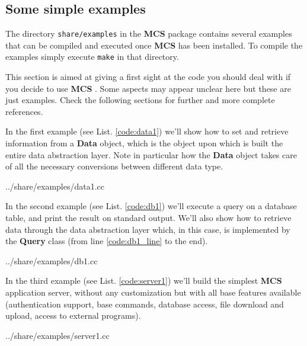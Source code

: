 \documentclass[12pt,titlepage]{article}
\newcommand{\mcs}{\textbf{MCS} }
\begin{document}
%
%
\subsection{Some simple examples}
\label{sec-somesimpleexamples}
The directory \verb|share/examples| in the \mcs package contains several
examples that can be compiled and executed once \mcs has been installed. To
compile the examples simply execute \verb|make| in that directory.

\bigskip
\noindent
This section is aimed at giving a first sight at the code you should
deal with if you decide to use \mcs. Some aspects may appear unclear
here but these are just examples. Check the following sections for
further and more complete references.

\medskip
\noindent
In the first example (see List. \ref{code:data1}) we'll show
how to set and retrieve information from a \textbf{Data} object, which
is the object upon which is built the entire data abstraction layer.
Note in particular how the \textbf{Data} object takes care of all
the necessary conversions between different data type.


{../share/examples/data1.cc}
\normalsize

\medskip
\noindent
In the second example (see List. \ref{code:db1}) we'll execute
a query on a database table, and print the result on standard output.
We'll also show how to retrieve data through the data abstraction
layer which, in this case, is implemented by the \textbf{Query} class
(from line \ref{code:db1_line} to the end).


{../share/examples/db1.cc}

\medskip
\noindent
In the third example (see List. \ref{code:server1}) we'll
build the simplest \mcs application server, without any customization
but with all base features available (authentication support, base
commands, database access, file download and upload, access to
external programs).


{../share/examples/server1.cc}
\end{document}
